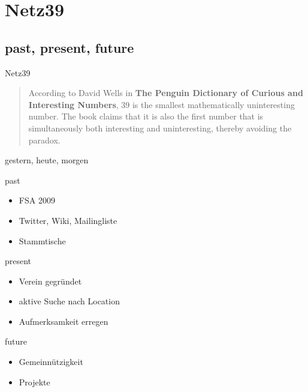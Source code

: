 \documentclass[hyperref={pdfpagelabels=false}]{beamer}
\begin{document}
\section{Netz39}

\subsection{past, present, future}

\begin{frame}{Netz39}
    \begin{quote}
        According to David Wells in \textbf{The Penguin Dictionary of Curious and
        Interesting Numbers}, 39 is the smallest mathematically uninteresting
        number. The book claims that it is also the first number that is
        simultaneously both interesting and uninteresting, thereby avoiding the
        paradox. \cite{Wikipedia2010}
    \end{quote}
\end{frame}

\begin{frame}{gestern, heute, morgen}
    \begin{block}{past}
        \begin{itemize}
            \item FSA 2009
            \item Twitter, Wiki, Mailingliste
            \item Stammtische
        \end{itemize}
    \end{block}
    \pause
    \begin{block}{present}
        \begin{itemize}
            \item Verein gegründet
            \item aktive Suche nach Location
            \item Aufmerksamkeit erregen
        \end{itemize}
    \end{block}
    \pause
    \begin{block}{future}
        \begin{itemize}
            \item Gemeinnützigkeit
            \item Projekte
        \end{itemize}
    \end{block}
\end{frame}
\end{document}
